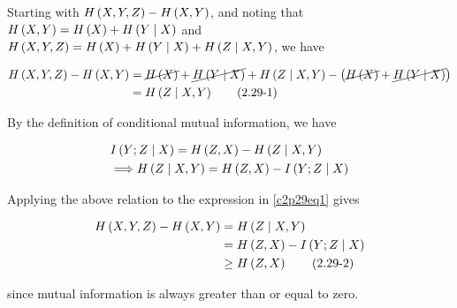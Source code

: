 \documentclass[ClusteringConnectionsMAIN.tex]{subfiles}
\begin{document}
	

  Starting with $H \left( X, Y, Z \right) - H \left( X, Y \right)$, and noting that $H \left( X, Y \right) = H \left( X \right) + H \left( Y \mid X \right)$ and $H \left( X, Y, Z \right) = H \left( X \right) + H \left( Y \mid X \right) + H \left( Z \mid X, Y \right)$, we have

\begin{align} \label{c2p29eq1}
H \left( X, Y, Z \right) - H \left( X, Y \right) &= \cancel{ H \left( X \right) } + \cancel{ H \left( Y \mid X \right) } + H \left( Z \mid X, Y \right) - \left( \cancel{ H \left( X \right) } + \cancel{ H \left( Y \mid X \right) } \right)   \notag \\
&= H \left( Z \mid X, Y \right)   \tag{2.29-1}
\end{align}

By the definition of conditional mutual information, we have

\begin{align}
&I \left( Y; Z \mid X \right) = H \left( Z, X \right) - H \left( Z \mid X, Y \right)  \notag \\
&\Longrightarrow H \left( Z \mid X, Y \right) = H \left( Z, X \right) - I \left( Y; Z \mid X \right)  \notag
\end{align}

Applying the above relation to the expression in \ref{c2p29eq1} gives

\begin{align} \label{c2p29eq2}
H \left( X, Y, Z \right) - H \left( X, Y \right) &= H \left( Z \mid X, Y \right)   \notag \\
&= H \left( Z, X \right) - I \left( Y; Z \mid X \right)   \notag \\
&\geq H \left( Z, X \right)  \tag{2.29-2} 
\end{align}

since mutual information is always greater than or equal to zero.
\end{document}
